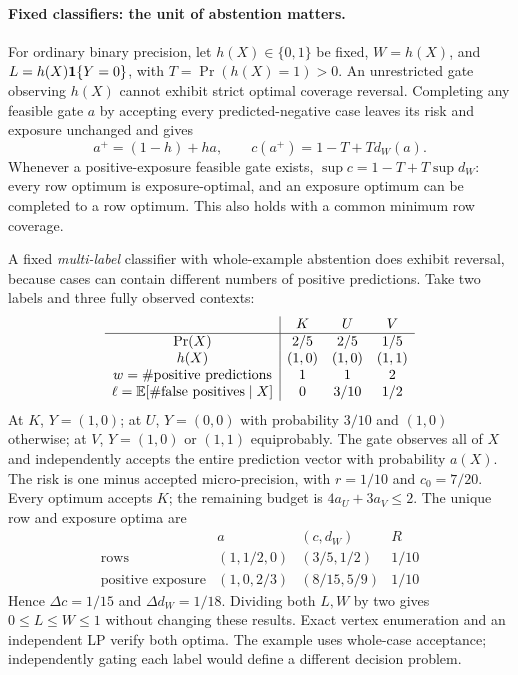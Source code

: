 \paragraph{Fixed classifiers: the unit of abstention matters.}\label{app:classification}
For ordinary binary precision, let $h(X)\in\{0,1\}$ be fixed,
$W=h(X)$, and $L=h(X)\mathbf{1}\{Y=0\}$, with $T=\Pr(h(X)=1)>0$.
An unrestricted gate observing $h(X)$ cannot exhibit strict optimal
coverage reversal. Completing any feasible gate $a$ by accepting every
predicted-negative case leaves its risk and exposure unchanged and gives
\[
 a^+=(1-h)+ha,\qquad c(a^+)=1-T+T d_W(a).
\]
Whenever a positive-exposure feasible gate exists, $\sup c=1-T+T\sup d_W$: every row optimum is exposure-optimal,
and an exposure optimum can be completed to a row optimum.
This also holds with a common minimum row coverage.

A fixed \emph{multi-label} classifier with whole-example abstention does
exhibit reversal, because cases can contain different numbers of positive
predictions. Take two labels and three fully observed contexts:
\[
\begin{array}{c|ccc}
 &K&U&V\\\hline
 \Pr(X)&2/5&2/5&1/5\\
 h(X)&(1,0)&(1,0)&(1,1)\\
 w=\#\text{positive predictions}&1&1&2\\
 \ell=\mathbb{E}[\#\text{false positives}\mid X]&0&3/10&1/2
\end{array}
\]
At $K$, $Y=(1,0)$; at $U$, $Y=(0,0)$ with probability $3/10$
and $(1,0)$ otherwise; at $V$, $Y=(1,0)$ or $(1,1)$ equiprobably.
The gate observes all of $X$ and independently accepts the entire
prediction vector with probability $a(X)$.
The risk is one minus accepted micro-precision, with $r=1/10$ and
$c_0=7/20$. Every optimum accepts $K$; the remaining budget is
$4a_U+3a_V\leq2$. The unique row and exposure optima are
\[
\begin{array}{c|ccc}
 &a&(c,d_W)&R\\\hline
 \text{rows}&(1,1/2,0)&(3/5,1/2)&1/10\\
 \text{positive exposure}&(1,0,2/3)&(8/15,5/9)&1/10
\end{array}
\]
Hence $\Delta c=1/15$ and $\Delta d_W=1/18$.
Dividing both $L,W$ by two gives $0\leq L\leq W\leq1$ without
changing these results. Exact vertex enumeration and an independent LP
verify both optima. The example uses whole-case acceptance; independently
gating each label would define a different decision problem.
